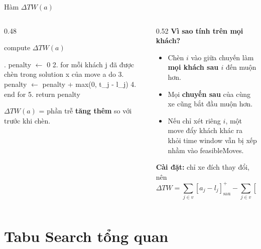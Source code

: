 \documentclass[aspectratio=169]{beamer}
\newcommand{\hl}[1]{\textcolor{blue!60!black}{\textbf{#1}}}
\newenvironment{pseudo}{\par\scriptsize\ttfamily\obeylines\obeyspaces}{\par}
\newcommand{\ind}{\hspace*{1.2em}}
\begin{document}
\begin{frame}[fragile]{Hàm $\Delta TW(a)$}
  \begin{columns}[T]
    \begin{column}{0.48\textwidth}
      \begin{block}{compute $\Delta TW(a)$}
        \begin{pseudo}
1. penalty $\leftarrow$ 0
2. for mỗi khách j đã được chèn
\ind trong solution x của move a do
3. \ind penalty $\leftarrow$ penalty + max(0, t\_j - l\_j)
4. end for
5. return penalty
        \end{pseudo}
      \end{block}
      \small $\Delta TW(a)$ = phần trễ \hl{tăng thêm} so với trước khi chèn.
    \end{column}
    \begin{column}{0.52\textwidth}
      \textbf{Vì sao tính trên mọi khách?}
      \begin{itemize}
        \item \small Chèn $i$ vào giữa chuyến làm \hl{mọi khách sau $i$} đến muộn hơn.
        \item \small Mọi \hl{chuyến sau} của cùng xe cũng bắt đầu muộn hơn.
        \item \small Nếu chỉ xét riêng $i$, một move đẩy khách khác ra khỏi time window vẫn bị xếp nhầm vào feasibleMoves.
      \end{itemize}
      \textbf{Cài đặt:} chỉ xe đích thay đổi, nên
      $$\Delta TW = \sum_{j \in v} [a_j - l_j]^+_{\text{sau}} - \sum_{j \in v} [a_j - l_j]^+_{\text{trước}}$$
    \end{column}
  \end{columns}
\end{frame}

\section{Tabu Search tổng quan}
\end{document}
